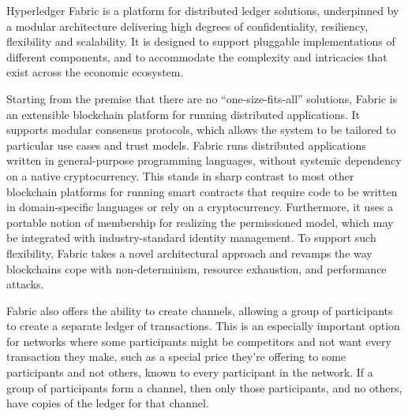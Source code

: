 Hyperledger Fabric is a platform for distributed ledger solutions, underpinned by a modular architecture delivering high degrees of confidentiality, resiliency, flexibility and scalability. It is designed to support pluggable implementations of different components, and to accommodate the complexity and intricacies that exist across the economic ecosystem.

Starting from the premise that there are no ``one-size-fits-all'' solutions, Fabric is an extensible blockchain platform for running distributed applications.  It supports modular consensus protocols, which allows the system to be tailored to particular use cases and trust models. Fabric runs distributed applications written in general-purpose programming languages, without systemic dependency on a native cryptocurrency.  This stands in sharp contrast to most other blockchain platforms for running smart contracts that require code to be written in domain-specific languages or rely on a cryptocurrency.  Furthermore, it uses a portable notion of membership for realizing the permissioned model, which may be integrated with industry-standard identity management.  To support such flexibility, Fabric takes a novel architectural approach and revamps the way blockchains cope with non-determinism, resource exhaustion, and performance attacks.


Fabric also offers the ability to create channels, allowing a group of participants to create a separate ledger of transactions. This is an especially important option for networks where some participants might be competitors and not want every transaction they make, such as a special price they’re offering to some participants and not others, known to every participant in the network. If a group of participants form a channel, then only those participants, and no others, have copies of the ledger for that channel.
